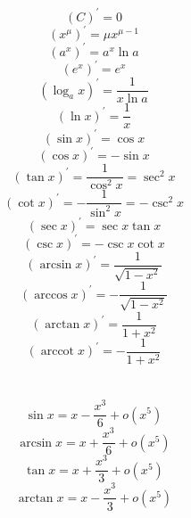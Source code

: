 \documentclass[]{article}
\numberwithin{equation}{section}
\DeclareMathOperator{\arccot}{arccot}
\begin{document}
\section{}
\begin{equation}
    (C)^{'}=0
\end{equation}
\begin{equation}
    (x^\mu)^{'}=\mu x^{\mu -1}
\end{equation}
\begin{equation}
    (a^x)^{'}=a^x\ln a
\end{equation}
\begin{equation}
    (e^x)^{'}=e^x
\end{equation}
\begin{equation}
    (\log_a x)^{'}=\frac{1}{x\ln a}
\end{equation}
\begin{equation}
    (\ln x)^{'}=\frac{1}{x}
\end{equation}
\begin{equation}
    (\sin x)^{'}=\cos x
\end{equation}
\begin{equation}
    (\cos x)^{'}=-\sin x
\end{equation}
\begin{equation}
    (\tan x)^{'}=\frac{1}{\cos^2 x}=\sec^2 x
\end{equation}
\begin{equation}
    (\cot x)^{'}=-\frac{1}{\sin^2 x}=-\csc^2 x
\end{equation}
\begin{equation}
    (\sec x)^{'}=\sec x\tan x
\end{equation}
\begin{equation}
    (\csc x)^{'}=-\csc x\cot x
\end{equation}
\begin{equation}
    (\arcsin x)^{'}=\frac{1}{\sqrt{1-x^2}}
\end{equation}
\begin{equation}
    (\arccos x)^{'}=-\frac{1}{\sqrt{1-x^2}}
\end{equation}
\begin{equation}
    (\arctan x)^{'}=\frac{1}{1+x^2}
\end{equation}
\begin{equation}
    (\arccot x)^{'}=-\frac{1}{1+x^2}
\end{equation}

\section{}
\begin{equation}
    \sin x=x-\frac{x^3}{6}+o(x^5)
\end{equation}
\begin{equation}
    \arcsin x=x+\frac{x^3}{6}+o(x^5)
\end{equation}
\begin{equation}
    \tan x=x+\frac{x^3}{3}+o(x^5)
\end{equation}
\begin{equation}
    \arctan x=x-\frac{x^3}{3}+o(x^5)
\end{equation}
\end{document}

